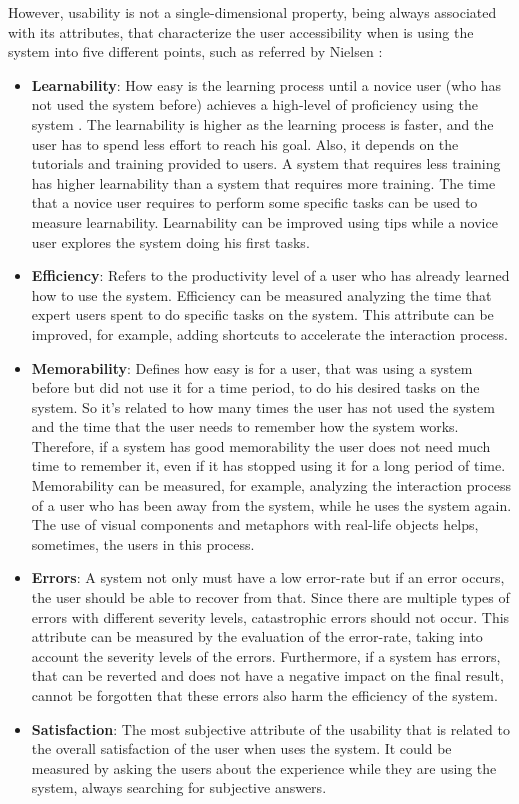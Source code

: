 However, usability is not a single-dimensional property, being always associated with its attributes, that characterize the user accessibility when is using the system into five different points, such as referred by Nielsen \cite{usabilityEngineering}:

\begin{itemize}
	\item \textbf{Learnability}: How easy is the learning process until a novice user (who has not used the system before) achieves a high-level of proficiency using the system \cite{measuringLearnabilityInHumanComputerInteraction}. The learnability is higher as the learning process is faster, and the user has to spend less effort to reach his goal. Also, it depends on the tutorials and training provided to users. A system that requires less training has higher learnability than a system that requires more training. The time that a novice user requires to perform some specific tasks can be used to measure learnability. Learnability can be improved using tips while a novice user explores the system doing his first tasks.
	\item \textbf{Efficiency}: Refers to the productivity level of a user who has already learned how to use the system. Efficiency can be measured analyzing the time that expert users spent to do specific tasks on the system. This attribute can be improved, for example, adding shortcuts to accelerate the interaction process.
	\item \textbf{Memorability}: Defines how easy is for a user, that was using a system before but did not use it for a time period, to do his desired tasks on the system. So it’s related to how many times the user has not used the system and the time that the user needs to remember how the system works. Therefore, if a system has good memorability the user does not need much time to remember it, even if it has stopped using it for a long period of time. Memorability can be measured, for example, analyzing the interaction process of a user who has been away from the system, while he uses the system again. The use of visual components and metaphors with real-life objects helps, sometimes, the users in this process.
	\item \textbf{Errors}: A system not only must have a low error-rate but if an error occurs, the user should be able to recover from that. Since there are multiple types of errors with different severity levels, catastrophic errors should not occur. This attribute can be measured by the evaluation of the error-rate, taking into account the severity levels of the errors. Furthermore, if a system has errors, that can be reverted and does not have a negative impact on the final result, cannot be forgotten that these errors also harm the efficiency of the system.
	\item \textbf{Satisfaction}: The most subjective attribute of the usability that is related to the overall satisfaction of the user when uses the system. It could be measured by asking the users about the experience while they are using the system, always searching for subjective answers.
\end{itemize}

